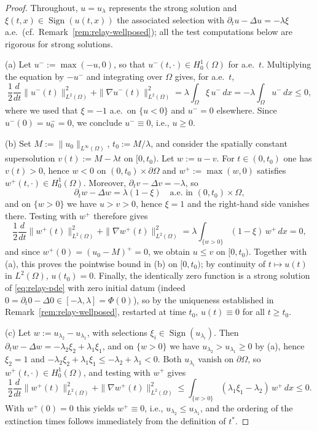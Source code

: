 \documentclass[11pt]{elsarticle}
\theoremstyle{definition}
\theoremstyle{remark}
\numberwithin{equation}{section}
\DeclareMathOperator{\Sign}{Sign}
\begin{document}
\begin{proof}
	Throughout, $u=u_\lambda$ represents the strong solution and
	$\xi(t,x)\in\Sign(u(t,x))$ the associated selection with
	$\partial_tu-\Delta u=-\lambda\xi$ a.e.\ (cf.\
	Remark~\ref{rem:relay-wellposed}); all the test computations below are
	rigorous for strong solutions.
	
	(a) Let $u^-:=\max(-u,0)$, so that $u^-(t,\cdot)\in H_0^1(\Omega)$ for
	a.e.\ $t$. Multiplying the equation by $-u^-$ and integrating over
	$\Omega$ gives, for a.e.\ $t$,
	\[
	\frac12\frac{d}{dt}\|u^-(t)\|_{L^2(\Omega)}^2
	+\|\nabla u^-(t)\|_{L^2(\Omega)}^2
	=\lambda\int_\Omega\xi\,u^-\,dx
	=-\lambda\int_\Omega u^-\,dx\le0,
	\]
	where we used that $\xi=-1$ a.e.\ on $\{u<0\}$ and $u^-=0$ elsewhere.
	Since $u^-(0)=u_0^-=0$, we conclude $u^-\equiv0$, i.e., $u\ge0$.
	
	(b) Set $M:=\|u_0\|_{L^\infty(\Omega)}$, $t_0:=M/\lambda$, and
	consider the spatially constant supersolution
	$v(t):=M-\lambda t$ on $[0,t_0)$. Let $w:=u-v$. For $t\in(0,t_0)$ one
	has $v(t)>0$, hence $w<0$ on $(0,t_0)\times\partial\Omega$ and
	$w^+:=\max(w,0)$ satisfies $w^+(t,\cdot)\in H_0^1(\Omega)$. Moreover,
	$\partial_tv-\Delta v=-\lambda$, so
	\[
	\partial_tw-\Delta w=\lambda(1-\xi)
	\quad\text{a.e.\ in }(0,t_0)\times\Omega,
	\]
	and on $\{w>0\}$ we have $u>v>0$, hence $\xi=1$ and the right-hand
	side vanishes there. Testing with $w^+$ therefore gives
	\[
	\frac12\frac{d}{dt}\|w^+(t)\|_{L^2(\Omega)}^2
	+\|\nabla w^+(t)\|_{L^2(\Omega)}^2
	=\lambda\int_{\{w>0\}}(1-\xi)\,w^+\,dx=0,
	\]
	and since $w^+(0)=(u_0-M)^+=0$, we obtain $u\le v$ on $[0,t_0)$.
	Together with (a), this proves the pointwise bound in (b) on
	$[0,t_0)$; by continuity of $t\mapsto u(t)$ in $L^2(\Omega)$,
	$u(t_0)=0$. Finally, the identically zero function is a strong
	solution of \eqref{eq:relay-pde} with zero initial datum
	(indeed $0=\partial_t0-\Delta 0\in[-\lambda,\lambda]=\Phi(0)$), so by
	the uniqueness established in Remark~\ref{rem:relay-wellposed},
	restarted at time $t_0$, $u(t)\equiv0$ for all $t\ge t_0$.
	
	(c) Let $w:=u_{\lambda_2}-u_{\lambda_1}$, with selections
	$\xi_i\in\Sign(u_{\lambda_i})$. Then
	$\partial_tw-\Delta w=-\lambda_2\xi_2+\lambda_1\xi_1$, and on
	$\{w>0\}$ we have $u_{\lambda_2}>u_{\lambda_1}\ge0$ by (a), hence
	$\xi_2=1$ and
	$-\lambda_2\xi_2+\lambda_1\xi_1\le-\lambda_2+\lambda_1<0$. Both
	$u_{\lambda_i}$ vanish on $\partial\Omega$, so
	$w^+(t,\cdot)\in H_0^1(\Omega)$, and testing with $w^+$ gives
	\[
	\frac12\frac{d}{dt}\|w^+(t)\|_{L^2(\Omega)}^2
	+\|\nabla w^+(t)\|_{L^2(\Omega)}^2
	\le\int_{\{w>0\}}(\lambda_1\xi_1-\lambda_2)\,w^+\,dx\le0 .
	\]
	With $w^+(0)=0$ this yields $w^+\equiv0$, i.e.,
	$u_{\lambda_2}\le u_{\lambda_1}$, and the ordering of the extinction
	times follows immediately from the definition of $t^*$.
\end{proof}
\end{document}
